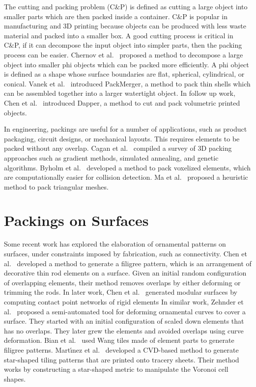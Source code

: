\newtext
{
The cutting and packing problem (C\&P) is defined as cutting a large object into smaller parts 
which are then packed inside a container.
C\&P is popular in manufacturing and 3D printing because
objects can be produced with less waste material and packed into a smaller box.
A good cutting process is critical in C\&P, if it can decompose the input object
into simpler parts, then the packing process can be easier.
Chernov et al.~\cite{Chernov2010} proposed a method to decompose a large object
into smaller phi objects which can be packed more efficiently.
A phi object is defined as a shape whose surface boundaries 
are flat, spherical, cylindrical, or conical.
Vanek et al.~\cite{Vanek2014} introduced PackMerger,
a method to pack thin shells which can be assembled together into
a larger watertight object.
In follow up work, Chen et al.~\cite{Chen2015} introduced Dapper,
a method to cut and pack volumetric printed objects.
}

\newtext
{
In engineering, packings are useful for a number of applications, 
such as product packaging, circuit designs, or mechanical layouts.
This requires elements to be packed without any overlap.
Cagan et al.~\cite{Cagan2002} compiled a survey of 3D packing approaches such as
gradient methods, simulated annealing, and genetic algorithms.
Byholm et al.~\cite{Byholm2009} developed a method
to pack voxelized elements, which are computationally easier for collision detection.
Ma et al.~\cite{Ma2018} proposed a heuristic method to pack triangular meshes.
}



\section{Packings on Surfaces}



\newtext
{
Some recent work has explored the elaboration of ornamental
patterns on surfaces, under constraints imposed by fabrication, such as connectivity.  
Chen et al.~\cite{Chen2016} developed a method to generate a filigree pattern,
which is an arrangement of decorative thin rod elements on a surface.
Given an initial random configuration of overlapping elements, their method
removes overlaps by either deforming or trimming the rods.
} In later work, Chen et al.~\cite{Chen2017} generated modular surfaces by
computing contact point networks of rigid elements
{
In similar work, Zehnder et al.~\cite{Zehnder2016} 
proposed a semi-automated tool for deforming ornamental curves to cover a surface. 
They started with an initial configuration of scaled down elements
that has no overlaps. They later grew the elements and avoided overlaps using curve deformation.
Bian et al.~\cite{Bian2018} used Wang tiles made of element parts to generate filigree patterns.
Mart\'{\i}nez et al.~\cite{Martinez2019} developed a CVD-based method to generate
star-shaped tiling patterns that are printed onto tracery sheets.
Their method works by constructing a star-shaped metric to manipulate the Voronoi cell shapes. 
}

